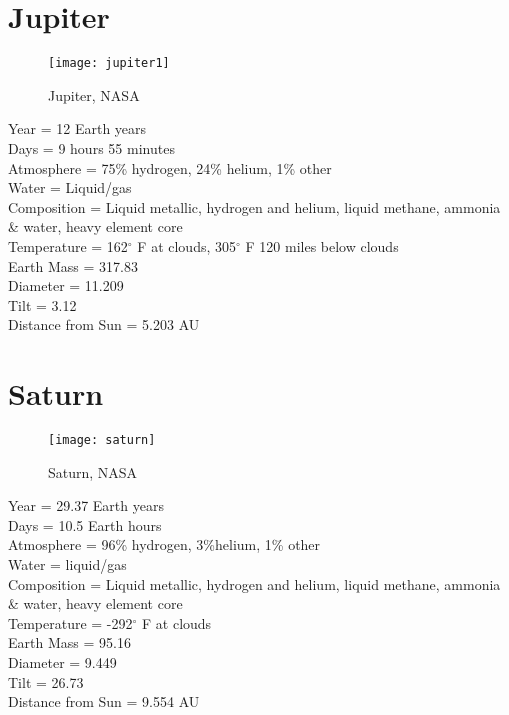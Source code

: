 \documentclass[12pt]{book}
\begin{document}
\section{Jupiter}
 \begin{wrapfigure}{R}{0.4\textwidth}
         \vspace{-1cm}
        \begin{center}
        \texttt{[image: jupiter1]}\caption{\scriptsize Jupiter, NASA}
        \end{center}
         \vspace{-1cm}
    \end{wrapfigure}
Year = 12 Earth years\\
Days = 9 hours 55 minutes\\
Atmosphere = 75\% hydrogen, 24\% helium, 1\% other\\
Water = Liquid/gas\\
Composition = Liquid metallic, hydrogen and helium, liquid methane, ammonia \& water, heavy element core\\
Temperature = 162$^{\circ}$ F at clouds, 305$^{\circ}$ F 120 miles below clouds\\
Earth Mass = 317.83\\
Diameter = 11.209\\ 
Tilt = 3.12\\
Distance from Sun = 5.203 AU\\
\section{Saturn}
 \begin{wrapfigure}{R}{0.4\textwidth}
         \vspace{-1cm}
        \begin{center}
        \texttt{[image: saturn]}\caption{\scriptsize Saturn, NASA}
        \end{center}
         \vspace{-1cm}
    \end{wrapfigure}
Year = 29.37 Earth years\\
Days = 10.5 Earth hours\\
Atmosphere = 96\% hydrogen, 3\%helium, 1\% other\\
Water = liquid/gas\\
Composition = Liquid metallic, hydrogen and helium, liquid methane, ammonia \& water, heavy element core\\
Temperature = -292$^{\circ}$ F at clouds\\
Earth Mass = 95.16\\
Diameter = 9.449\\ 
Tilt = 26.73\\
Distance from Sun = 9.554 AU\\
\newpage
\end{document}
